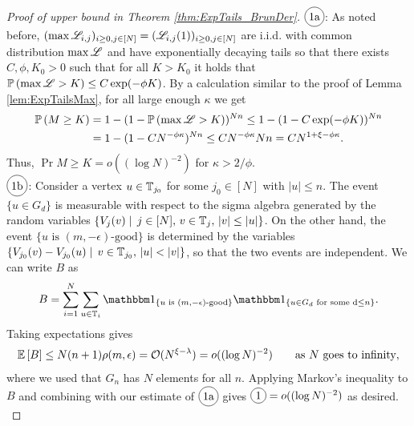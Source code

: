 \begin{proof}[Proof of upper bound in Theorem \ref{thm:ExpTails_BrunDer}]
$\circled{1a}$: As noted before, $(\max \mathscr{L}_{i,j})_{i \geq 0, j \in [N]} = (\mathscr{L}_{i, j}(1))_{i \geq 0, j \in [N]}$ are i.i.d. with common distribution $\max \mathscr{L}$ and have exponentially decaying tails so that there exists $C, \phi, K_0 > 0$ such that for all $K > K_0$ it holds that $\mathbb{P} \left( \max \mathscr{L} > K \right) \leq C \exp(-\phi K)$. By a calculation similar to the proof of Lemma \ref{lem:ExpTailsMax}, for all large enough $\kappa$ we get
\begin{align*}
\mathbb{P} \left( M \geq K \right) &= 1 - (1 - \mathbb{P} \left( \max \mathscr{L} > K \right))^{Nn} \leq 1 - (1 - C \exp(-\phi K))^{Nn} \\
			  &= 1 - (1 - C N^{-\phi \kappa})^{Nn} \leq C N^{-\phi \kappa} Nn = C N^{1 + \xi - \phi \kappa}. 	
\end{align*} 
Thus, $\Pr{M \geq K} = o((\log N)^{-2})$ for $\kappa > 2/\phi$. \\

$\circled{1b}$: Consider a vertex $u \in \mathbb{T}_{j_0}$ for some $j_0 \in [N]$ with $|u| \leq n$. The event $\{u \in G_d\}$ is measurable with respect to the sigma algebra generated by the random variables $\{ V_j(v) \mid\, j \in [N],\, v \in \mathbb{T}_j,\, |v| \leq |u|\}$. On the other hand, the event $\{ u \text{ is }(m, - \epsilon) \text{-good}\}$ is determined by the variables $\{ V_{j_0}(v) - V_{j_0}(u) \mid\, v \in \mathbb{T}_{j_0},\, |u| < |v| \}$, so that the two events are independent. We can write $B$ as 
\begin{equation}\nonumber
B = \sum\limits_{i=1}^N \sum\limits_{u \in \bb{T}_i} \Ind_{\{u \text{ is } (m, - \epsilon)\text{-good}\}} \Ind_{\{u \in G_d \text{ for some d} \leq n \}}. 
\end{equation}
Taking expectations gives 
\begin{equation}\nonumber
\mathbb{E}\left[ B \right] \leq N(n+1)\rho(m, \epsilon) = \mathcal{O}(N^{\xi -\lambda}) = o((\log N)^{-2}) \qquad\text{as $N$ goes to infinity}, 
\end{equation}
where we used that $G_n$ has $N$ elements for all $n$. Applying Markov's inequality to $B$ and combining with our estimate of $\circled{1a}$ gives $\circled{1} = o((\log N)^{-2})$ as desired. \\


\end{proof}
